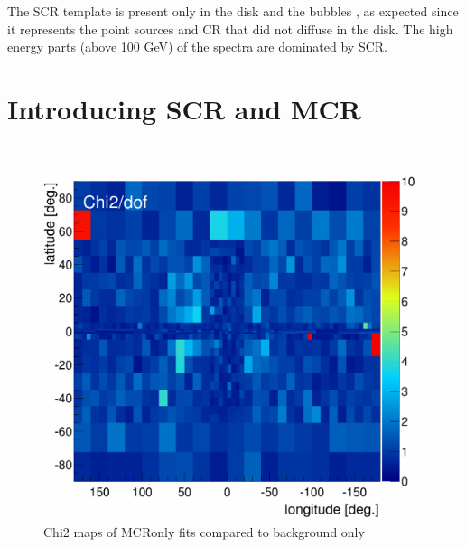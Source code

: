 The SCR template is present only in the disk and the bubbles , as expected since it represents the point sources and CR that did not diffuse in the disk. The high energy parts (above 100 GeV) of the spectra are dominated by SCR.








\section{Introducing SCR and MCR}

\begin{figure}[h]
  \centering
  \includegraphics[width=.5\linewidth]{pic/results/MCRonly_chi2Distribution.png}
  \caption{Chi2 maps of MCRonly fits compared to background only}
  \label{fig:MCRonly_chi2Distribution}
\end{figure}

